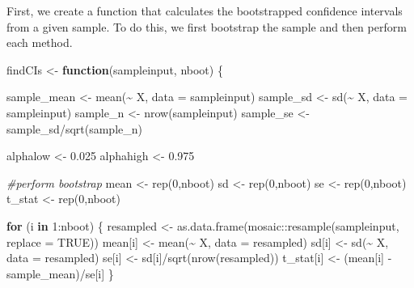\documentclass[12pt]{article}
\newenvironment{Shaded}{\begin{snugshade}}{\end{snugshade}}
\newcommand{\AttributeTok}[1]{\textcolor[rgb]{0.77,0.63,0.00}{#1}}
\newcommand{\CommentTok}[1]{\textcolor[rgb]{0.56,0.35,0.01}{\textit{#1}}}
\newcommand{\ConstantTok}[1]{\textcolor[rgb]{0.00,0.00,0.00}{#1}}
\newcommand{\ControlFlowTok}[1]{\textcolor[rgb]{0.13,0.29,0.53}{\textbf{#1}}}
\newcommand{\DecValTok}[1]{\textcolor[rgb]{0.00,0.00,0.81}{#1}}
\newcommand{\FloatTok}[1]{\textcolor[rgb]{0.00,0.00,0.81}{#1}}
\newcommand{\FunctionTok}[1]{\textcolor[rgb]{0.00,0.00,0.00}{#1}}
\newcommand{\NormalTok}[1]{#1}
\newcommand{\OtherTok}[1]{\textcolor[rgb]{0.56,0.35,0.01}{#1}}
\newcommand{\SpecialCharTok}[1]{\textcolor[rgb]{0.00,0.00,0.00}{#1}}
\begin{document}
First, we create a function that calculates the bootstrapped confidence
intervals from a given sample. To do this, we first bootstrap the sample
and then perform each method.

\begin{Shaded}
\begin{Highlighting}[]
\NormalTok{findCIs }\OtherTok{\textless{}{-}} \ControlFlowTok{function}\NormalTok{(sampleinput, nboot) \{}
  
\NormalTok{  sample\_mean }\OtherTok{\textless{}{-}} \FunctionTok{mean}\NormalTok{(}\SpecialCharTok{\textasciitilde{}}\NormalTok{ X, }\AttributeTok{data =}\NormalTok{ sampleinput)}
\NormalTok{  sample\_sd }\OtherTok{\textless{}{-}} \FunctionTok{sd}\NormalTok{(}\SpecialCharTok{\textasciitilde{}}\NormalTok{ X, }\AttributeTok{data =}\NormalTok{ sampleinput)}
\NormalTok{  sample\_n }\OtherTok{\textless{}{-}} \FunctionTok{nrow}\NormalTok{(sampleinput)}
\NormalTok{  sample\_se }\OtherTok{\textless{}{-}}\NormalTok{ sample\_sd}\SpecialCharTok{/}\FunctionTok{sqrt}\NormalTok{(sample\_n)}
  
\NormalTok{  alphalow }\OtherTok{\textless{}{-}} \FloatTok{0.025}
\NormalTok{  alphahigh }\OtherTok{\textless{}{-}} \FloatTok{0.975}
  
  \CommentTok{\#perform bootstrap}
\NormalTok{  mean }\OtherTok{\textless{}{-}} \FunctionTok{rep}\NormalTok{(}\DecValTok{0}\NormalTok{,nboot)}
\NormalTok{  sd }\OtherTok{\textless{}{-}} \FunctionTok{rep}\NormalTok{(}\DecValTok{0}\NormalTok{,nboot)}
\NormalTok{  se }\OtherTok{\textless{}{-}} \FunctionTok{rep}\NormalTok{(}\DecValTok{0}\NormalTok{,nboot)}
\NormalTok{  t\_stat }\OtherTok{\textless{}{-}} \FunctionTok{rep}\NormalTok{(}\DecValTok{0}\NormalTok{,nboot)}

  \ControlFlowTok{for}\NormalTok{ (i }\ControlFlowTok{in} \DecValTok{1}\SpecialCharTok{:}\NormalTok{nboot) \{}
\NormalTok{    resampled }\OtherTok{\textless{}{-}} \FunctionTok{as.data.frame}\NormalTok{(mosaic}\SpecialCharTok{::}\FunctionTok{resample}\NormalTok{(sampleinput, }\AttributeTok{replace =} \ConstantTok{TRUE}\NormalTok{))}
\NormalTok{    mean[i] }\OtherTok{\textless{}{-}} \FunctionTok{mean}\NormalTok{(}\SpecialCharTok{\textasciitilde{}}\NormalTok{ X, }\AttributeTok{data =}\NormalTok{ resampled)}
\NormalTok{    sd[i] }\OtherTok{\textless{}{-}} \FunctionTok{sd}\NormalTok{(}\SpecialCharTok{\textasciitilde{}}\NormalTok{ X, }\AttributeTok{data =}\NormalTok{ resampled)}
\NormalTok{    se[i] }\OtherTok{\textless{}{-}}\NormalTok{ sd[i]}\SpecialCharTok{/}\FunctionTok{sqrt}\NormalTok{(}\FunctionTok{nrow}\NormalTok{(resampled))}
\NormalTok{    t\_stat[i] }\OtherTok{\textless{}{-}}\NormalTok{ (mean[i] }\SpecialCharTok{{-}}\NormalTok{ sample\_mean)}\SpecialCharTok{/}\NormalTok{se[i]}
\NormalTok{  \}}


\end{Highlighting}
\end{Shaded}
\end{document}
